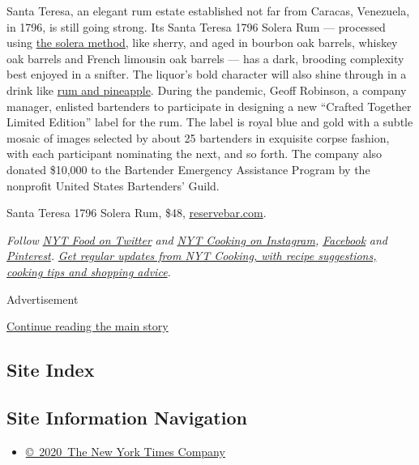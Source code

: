 Santa Teresa, an elegant rum estate established not far from Caracas,
Venezuela, in 1796, is still going strong. Its Santa Teresa 1796 Solera
Rum --- processed using
\href{https://www.nytimes.com/2019/08/01/dining/drinks/wine-school-manzanilla-sherry.html}{the
solera method}, like sherry, and aged in bourbon oak barrels, whiskey
oak barrels and French limousin oak barrels --- has a dark, brooding
complexity best enjoyed in a snifter. The liquor's bold character will
also shine through in a drink like
\href{https://cooking.nytimes.com/recipes/1016350-rum-and-pineapple-juice}{rum
and pineapple}. During the pandemic, Geoff Robinson, a company manager,
enlisted bartenders to participate in designing a new ``Crafted Together
Limited Edition'' label for the rum. The label is royal blue and gold
with a subtle mosaic of images selected by about 25 bartenders in
exquisite corpse fashion, with each participant nominating the next, and
so forth. The company also donated \$10,000 to the Bartender Emergency
Assistance Program by the nonprofit United States Bartenders' Guild.

Santa Teresa 1796 Solera Rum, \$48,
\href{https://www.reservebar.com/products/santa-teresa-1796-crafted-together-limited-edition-bottle}{reservebar.com}.

\emph{Follow} \href{https://twitter.com/nytfood}{\emph{NYT Food on
Twitter}} \emph{and}
\href{https://www.instagram.com/nytcooking/}{\emph{NYT Cooking on
Instagram}}\emph{,}
\href{https://www.facebook.com/nytcooking/}{\emph{Facebook}} \emph{and}
\href{https://www.pinterest.com/nytcooking/}{\emph{Pinterest}}\emph{.}
\href{https://www.nytimes.com/newsletters/cooking}{\emph{Get regular
updates from NYT Cooking, with recipe suggestions, cooking tips and
shopping advice}}\emph{.}

Advertisement

\protect\hyperlink{after-bottom}{Continue reading the main story}

\hypertarget{site-index}{%
\subsection{Site Index}\label{site-index}}

\hypertarget{site-information-navigation}{%
\subsection{Site Information
Navigation}\label{site-information-navigation}}

\begin{itemize}
\tightlist
\item
  \href{https://help.nytimes.com/hc/en-us/articles/115014792127-Copyright-notice}{©~2020~The
  New York Times Company}
\end{itemize}

